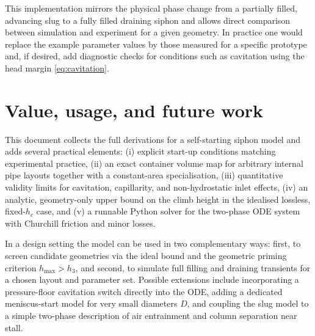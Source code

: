 \documentclass[11pt]{article}
\begin{document}
This implementation mirrors the physical phase change from a partially filled, advancing slug
to a fully filled draining siphon and allows direct comparison between simulation and
experiment for a given geometry. In practice one would replace the example parameter values
by those measured for a specific prototype and, if desired, add diagnostic checks for
conditions such as cavitation using the head margin \eqref{eq:cavitation}.

\section{Value, usage, and future work}

This document collects the full derivations for a self-starting siphon model and adds several
practical elements: (i) explicit start-up conditions matching experimental practice, (ii) an
exact container volume map for arbitrary internal pipe layouts together with a constant-area
specialisation, (iii) quantitative validity limits for cavitation, capillarity, and non-hydrostatic
inlet effects, (iv) an analytic, geometry-only upper bound on the climb height in the idealised
lossless, fixed-$h_c$ case, and (v) a runnable Python solver for the two-phase ODE system
with Churchill friction and minor losses.

In a design setting the model can be used in two complementary ways: first, to screen candidate
geometries via the ideal bound and the geometric priming criterion $h_{\max}>h_3$, and second,
to simulate full filling and draining transients for a chosen layout and parameter set. Possible
extensions include incorporating a pressure-floor cavitation switch directly into the ODE,
adding a dedicated meniscus-start model for very small diameters $D$, and coupling the slug
model to a simple two-phase description of air entrainment and column separation near stall.
\end{document}
